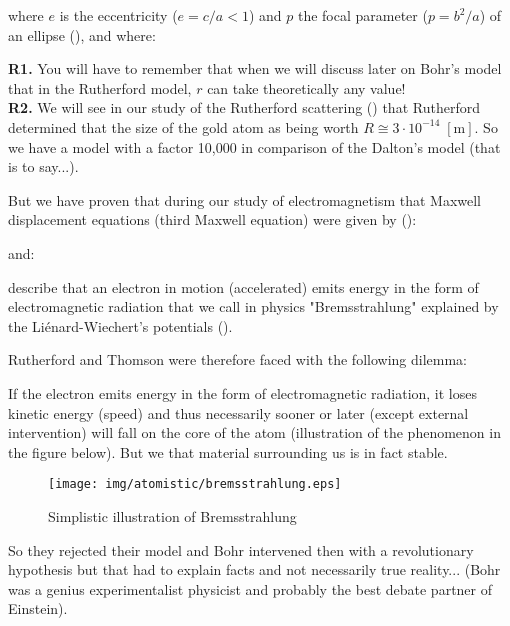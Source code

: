 where $e$ is the eccentricity ($e=c/a<1$) and $p$ the focal parameter ($p=b^2/a$) of an ellipse (), and where:
	

	\begin{tcolorbox}[title=Remarks,colframe=black,arc=10pt]
	\textbf{R1.} You will have to remember that when we will discuss later on Bohr's model that in the Rutherford model, $r$ can take theoretically any value!\\

	\textbf{R2.} We will see in our study of the Rutherford scattering () that Rutherford determined that the size of the gold atom as being worth $R\cong 3\cdot 10^{-14}\; [\text{m}]$. So we have a model with a factor 10,000 in comparison of the Dalton's model (that is to say...).
	\end{tcolorbox}	

But we have proven that during our study of electromagnetism that Maxwell displacement equations (third Maxwell equation) were given by ():
	
and:
	
describe that an electron in motion (accelerated) emits energy in the form of electromagnetic radiation that we call in physics "Bremsstrahlung" explained by the Liénard-Wiechert's potentials ().

Rutherford and Thomson were therefore faced with the following dilemma:

If the electron emits energy in the form of electromagnetic radiation, it loses kinetic energy (speed) and thus necessarily sooner or later (except external intervention) will fall on the core of the atom (illustration of the phenomenon in the figure below). But we that material surrounding us is in fact stable.
\begin{figure}[H]
\centering
\texttt{[image: img/atomistic/bremsstrahlung.eps]}
\caption{Simplistic illustration of Bremsstrahlung}
\end{figure}
So they rejected their model and Bohr intervened then with a revolutionary hypothesis but that had to explain facts and not necessarily true reality... (Bohr was a genius experimentalist physicist  and probably the best debate partner of Einstein).

